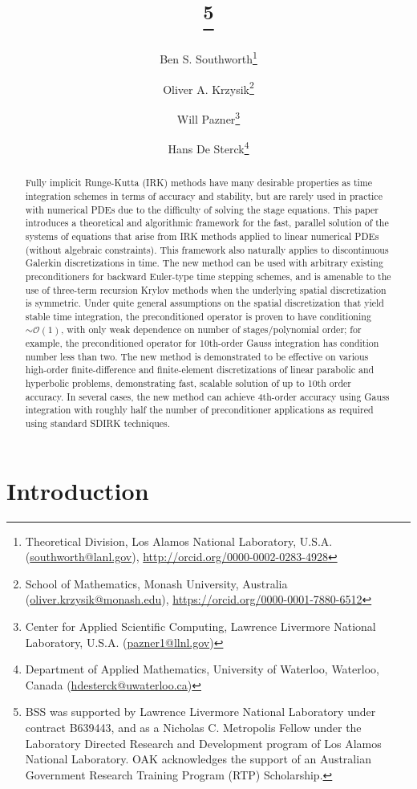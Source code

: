 \documentclass[a4paper,10pt]{article}
\title{{\TheTitle}\thanks{BSS was supported by Lawrence Livermore National 
      Laboratory under contract B639443, and as a Nicholas C. Metropolis Fellow
      under the Laboratory Directed Research and Development program of Los
      Alamos National Laboratory. OAK acknowledges the support of an Australian
      Government Research Training Program (RTP) Scholarship.}}
\author{
	Ben S. Southworth\thanks{Theoretical Division, Los Alamos National Laboratory,
    U.S.A. (\url{southworth@lanl.gov}),
    \url{http://orcid.org/0000-0002-0283-4928}}
\and
    Oliver A. Krzysik\thanks{School of Mathematics, Monash University,
  	Australia (\url{oliver.krzysik@monash.edu}),
  	\url{https://orcid.org/0000-0001-7880-6512}}
\and
  	Will Pazner\thanks{Center for Applied Scientific Computing, Lawrence Livermore National Laboratory,
    U.S.A. (\url{pazner1@llnl.gov})}
\and
    Hans De Sterck\thanks{Department of Applied Mathematics,
  	University of Waterloo,
  	Waterloo, Canada
  	(\url{hdesterck@uwaterloo.ca})}
}
\begin{document}
\maketitle
\allowdisplaybreaks

\begin{abstract}
Fully implicit Runge-Kutta (IRK) methods have many desirable properties as time
integration schemes in terms of accuracy and stability, but are rarely used in
practice with numerical PDEs due to the difficulty of solving the stage
equations. This paper introduces a theoretical and algorithmic framework for the
fast, parallel solution of the systems of equations that arise from IRK methods
applied to linear numerical PDEs (without algebraic constraints). This framework
also naturally applies to discontinuous Galerkin discretizations in time. The
new method can be used with arbitrary existing preconditioners for backward
Euler-type time stepping schemes, and is amenable to the use of three-term
recursion Krylov methods when the underlying spatial discretization is
symmetric. Under quite general assumptions on the spatial discretization that
yield stable time integration, the preconditioned operator is proven to have
conditioning $\sim\mathcal{O}(1)$, with only weak dependence on number of
stages/polynomial order; for example, the preconditioned operator for 10th-order
Gauss integration has condition number less than two. The new method is
demonstrated to be effective on various high-order finite-difference and
finite-element discretizations of linear parabolic and hyperbolic problems,
demonstrating fast, scalable solution of up to 10th order accuracy. In several
cases, the new method can achieve 4th-order accuracy using Gauss integration
with roughly half the number of preconditioner applications as required using
standard SDIRK techniques.
\end{abstract}


\section{Introduction}\label{sec:intro}

\end{document}
